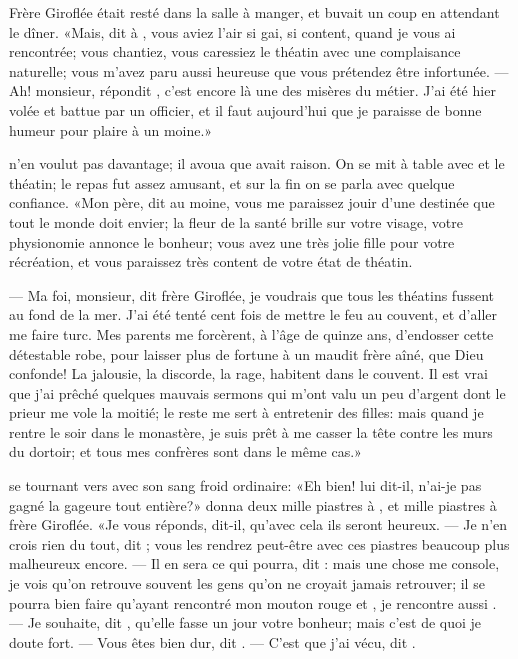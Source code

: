 Frère Giroflée était resté dans la salle à manger, et buvait un coup en
attendant le dîner. «Mais, dit  à , vous aviez l’air si
gai, si content, quand je vous ai rencontrée; vous chantiez, vous
caressiez le théatin avec une complaisance naturelle; vous m’avez paru
aussi heureuse que vous prétendez être infortunée. — Ah! monsieur,
répondit , c’est encore là une des misères du métier. J’ai été
hier volée et battue par un officier, et il faut aujourd’hui que je
paraisse de bonne humeur pour plaire à un moine.»

 n’en voulut pas davantage; il avoua que  avait raison. On
se mit à table avec  et le théatin; le repas fut assez amusant,
et sur la fin on se parla avec quelque confiance. «Mon père, dit 
au moine, vous me paraissez jouir d’une destinée que tout le monde doit
envier; la fleur de la santé brille sur votre visage, votre physionomie
annonce le bonheur; vous avez une très jolie fille pour votre
récréation, et vous paraissez très content de votre état de théatin.


— Ma foi, monsieur, dit frère Giroflée, je voudrais que tous les théatins
fussent au fond de la mer. J’ai été tenté cent fois de mettre le feu au
couvent, et d’aller me faire turc. Mes parents me forcèrent, à l’âge de
quinze ans, d’endosser cette détestable robe, pour laisser plus de
fortune à un maudit frère aîné, que Dieu confonde! La jalousie, la
discorde, la rage, habitent dans le couvent. Il est vrai que j’ai
prêché quelques mauvais sermons qui m’ont valu un peu d’argent dont le
prieur me vole la moitié; le reste me sert à entretenir des filles:
mais quand je rentre le soir dans le monastère, je suis prêt à me
casser la tête contre les murs du dortoir; et tous mes confrères sont
dans le même cas.»

 se tournant vers  avec son sang froid ordinaire: «Eh bien!
lui dit-il, n’ai-je pas gagné la gageure tout entière?»  donna
deux mille piastres à , et mille piastres à frère Giroflée. «Je
vous réponds, dit-il, qu’avec cela ils seront heureux. — Je n’en crois
rien du tout, dit ; vous les rendrez peut-être avec ces piastres
beaucoup plus malheureux encore. — Il en sera ce qui pourra, dit :
mais une chose me console, je vois qu’on retrouve souvent les gens
qu’on ne croyait jamais retrouver; il se pourra bien faire qu’ayant
rencontré mon mouton rouge et , je rencontre aussi .
— Je souhaite, dit , qu’elle fasse un jour votre bonheur; mais
c’est de quoi je doute fort. — Vous êtes bien dur, dit . — C’est que
j’ai vécu, dit . 

